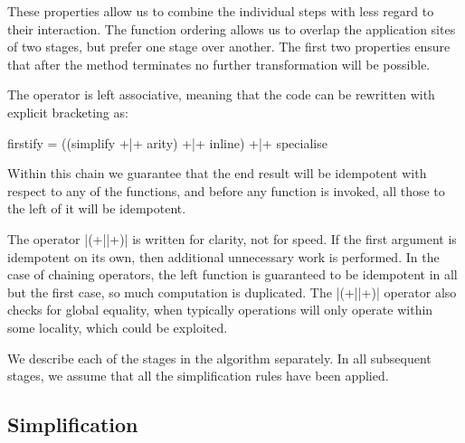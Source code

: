 \documentclass[preprint]{sigplanconf}
\begin{document}
These properties allow us to combine the individual steps with less regard to their interaction. The function ordering allows us to overlap the application sites of two stages, but prefer one stage over another. The first two properties ensure that after the method terminates no further transformation will be possible.

The operator is left associative, meaning that the code can be rewritten with explicit bracketing as:

\begin{code}
firstify = ((simplify +|+ arity) +|+ inline) +|+ specialise
\end{code}

Within this chain we guarantee that the end result will be idempotent with respect to any of the functions, and before any function is invoked, all those to the left of it will be idempotent.

The operator |(+||+)| is written for clarity, not for speed. If the first argument is idempotent on its own, then additional unnecessary work is performed. In the case of chaining operators, the left function is guaranteed to be idempotent in all but the first case, so much computation is duplicated. The |(+||+)| operator also checks for global equality, when typically operations will only operate within some locality, which could be exploited.

We describe each of the stages in the algorithm separately. In all subsequent stages, we assume that all the simplification rules have been applied.


\subsection{Simplification}
\end{document}
